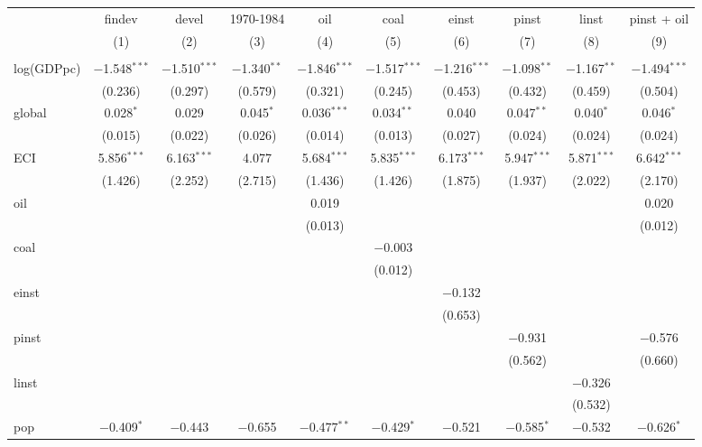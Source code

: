 
\begin{tabular}{@{\hspace{5pt}}l@{\hspace{5pt}}ccccccccc} 
\toprule 
 & findev & devel & 1970-1984 & oil & coal & einst & pinst & linst & pinst + oil \\ 
 & (1) & (2) & (3) & (4) & (5) & (6) & (7) & (8) & (9)\\ 
\midrule  
\\[-2.1ex] log(GDPpc) & $-$1.548$^{***}$ & $-$1.510$^{***}$ & $-$1.340$^{**}$ & $-$1.846$^{***}$ & $-$1.517$^{***}$ & $-$1.216$^{***}$ & $-$1.098$^{**}$ & $-$1.167$^{**}$ & $-$1.494$^{***}$ \\ 
  & (0.236) & (0.297) & (0.579) & (0.321) & (0.245) & (0.453) & (0.432) & (0.459) & (0.504) \\ 
 \addlinespace 
 global & 0.028$^{*}$ & 0.029 & 0.045$^{*}$ & 0.036$^{***}$ & 0.034$^{**}$ & 0.040 & 0.047$^{**}$ & 0.040$^{*}$ & 0.046$^{*}$ \\ 
  & (0.015) & (0.022) & (0.026) & (0.014) & (0.013) & (0.027) & (0.024) & (0.024) & (0.024) \\ 
 \addlinespace 
 ECI & 5.856$^{***}$ & 6.163$^{***}$ & 4.077 & 5.684$^{***}$ & 5.835$^{***}$ & 6.173$^{***}$ & 5.947$^{***}$ & 5.871$^{***}$ & 6.642$^{***}$ \\ 
  & (1.426) & (2.252) & (2.715) & (1.436) & (1.426) & (1.875) & (1.937) & (2.022) & (2.170) \\ 
 \addlinespace 
 oil &  &  &  & 0.019 &  &  &  &  & 0.020 \\ 
  &  &  &  & (0.013) &  &  &  &  & (0.012) \\ 
 \addlinespace 
 coal &  &  &  &  & $-$0.003 &  &  &  &  \\ 
  &  &  &  &  & (0.012) &  &  &  &  \\ 
 \addlinespace 
 einst &  &  &  &  &  & $-$0.132 &  &  &  \\ 
  &  &  &  &  &  & (0.653) &  &  &  \\ 
 \addlinespace 
 pinst &  &  &  &  &  &  & $-$0.931 &  & $-$0.576 \\ 
  &  &  &  &  &  &  & (0.562) &  & (0.660) \\ 
 \addlinespace 
 linst &  &  &  &  &  &  &  & $-$0.326 &  \\ 
  &  &  &  &  &  &  &  & (0.532) &  \\ 
 \addlinespace 
 pop & $-$0.409$^{*}$ & $-$0.443 & $-$0.655 & $-$0.477$^{**}$ & $-$0.429$^{*}$ & $-$0.521 & $-$0.585$^{*}$ & $-$0.532 & $-$0.626$^{*}$ \\ 

\end{tabular}
